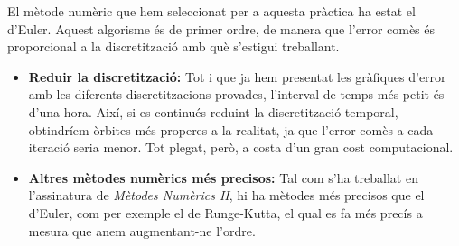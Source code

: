 \documentclass[10pt, twoside, a4paper]{article}
\begin{document}
El mètode numèric que hem seleccionat per a aquesta pràctica ha estat el d'Euler. Aquest algorisme és de primer ordre, de manera que l'error comès és proporcional a la discretització amb què s'estigui treballant.
\begin{itemize}
    \item \textbf{Reduir la discretització: } Tot i que ja hem presentat les gràfiques d'error amb les diferents discretitzacions provades, l'interval de temps més petit és d'una hora. Així, si es continués reduint la discretització temporal, obtindríem òrbites més properes a la realitat, ja que l'error comès a cada iteració seria menor. Tot plegat, però, a costa d'un gran cost computacional.
    \item \textbf{Altres mètodes numèrics més precisos: } Tal com s'ha treballat en l'assinatura de \textit{Mètodes Numèrics II}, hi ha mètodes més precisos que el d'Euler, com per exemple el de Runge-Kutta, el qual es fa més precís a mesura que anem augmentant-ne l'ordre.
\end{itemize}
\end{document}
